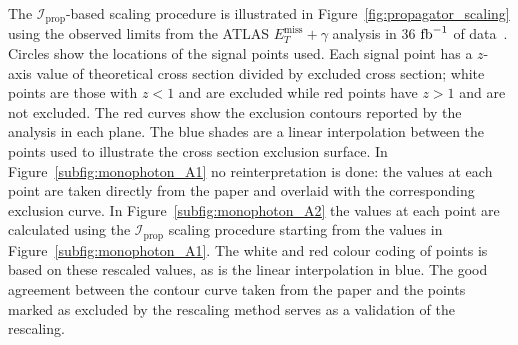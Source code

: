 \documentclass[a4paper, 11pt,notoc]{article}
\newcommand{\MET}{\ensuremath{E_T^\mathrm{miss}}\xspace}
\newcommand{\met}{\MET}
\newcommand{\ifb}{\ensuremath{\rm{fb}^{-1}}\xspace}
\begin{document}
The $\mathcal{I}_{\text{prop}}$-based scaling procedure is illustrated in Figure~\ref{fig:propagator_scaling} using the observed limits from the ATLAS $\met+\gamma$ analysis in 36 \ifb of data~\cite{monophoton}. Circles show the locations of the signal points used. Each signal point has a $z$-axis value of theoretical cross section divided by excluded cross section; white points are those with $z<1$ and are excluded while red points have $z>1$ and are not excluded. The red curves show the exclusion contours reported by the analysis in each plane. The blue shades are a linear interpolation between the points used to illustrate the cross section exclusion surface. In Figure~\ref{subfig:monophoton_A1} no reinterpretation is done: the values at each point are taken directly from the paper and overlaid with the corresponding exclusion curve. In Figure~\ref{subfig:monophoton_A2} the values at each point are calculated using the $\mathcal{I}_{\text{prop}}$ scaling procedure starting from the values in Figure~\ref{subfig:monophoton_A1}. The white and red colour coding of points is based on these rescaled values, as is the linear interpolation in blue. The good agreement between the contour curve taken from the paper and the points marked as excluded by the rescaling method serves as a validation of the rescaling.
\end{document}
